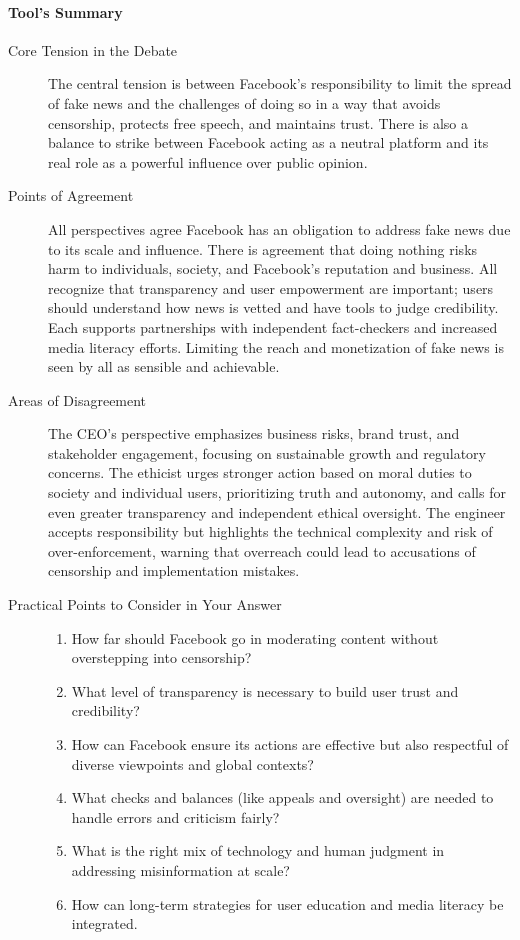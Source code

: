 \paragraph{Tool's Summary}{
  \begin{description}
    \item[Core Tension in the Debate] The central tension is between Facebook's responsibility to limit the spread of fake news and the challenges of doing so in a way that avoids censorship, protects free speech, and maintains trust. There is also a balance to strike between Facebook acting as a neutral platform and its real role as a powerful influence over public opinion.
    \item[Points of Agreement] All perspectives agree Facebook has an obligation to address fake news due to its scale and influence.
      There is agreement that doing nothing risks harm to individuals, society, and Facebook's reputation and business.
      All recognize that transparency and user empowerment are important; users should understand how news is vetted and have tools to judge credibility.
      Each supports partnerships with independent fact-checkers and increased media literacy efforts.
      Limiting the reach and monetization of fake news is seen by all as sensible and achievable.
    \item[Areas of Disagreement] The CEO's perspective emphasizes business risks, brand trust, and stakeholder engagement, focusing on sustainable growth and regulatory concerns.
      The ethicist urges stronger action based on moral duties to society and individual users, prioritizing truth and autonomy, and calls for even greater transparency and independent ethical oversight.
      The engineer accepts responsibility but highlights the technical complexity and risk of over-enforcement, warning that overreach could lead to accusations of censorship and implementation mistakes.
    \item[Practical Points to Consider in Your Answer]{
        \hfill
        \begin{enumerate}[label=(\alph*)]
          \item How far should Facebook go in moderating content without overstepping into censorship?
          \item What level of transparency is necessary to build user trust and credibility?
          \item How can Facebook ensure its actions are effective but also respectful of diverse viewpoints and global contexts?
          \item What checks and balances (like appeals and oversight) are needed to handle errors and criticism fairly?
          \item What is the right mix of technology and human judgment in addressing misinformation at scale?
          \item How can long-term strategies for user education and media literacy be integrated.
        \end{enumerate}
      }
  \end{description}
}

